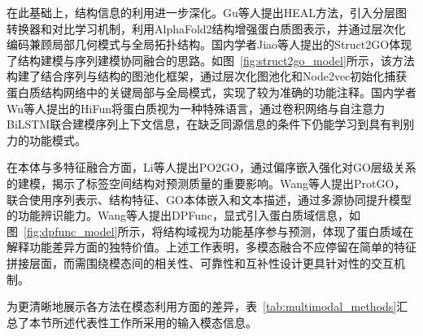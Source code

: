 在此基础上，结构信息的利用进一步深化。Gu等人\cite{gu2023hierarchical}提出HEAL方法，引入分层图转换器和对比学习机制，利用AlphaFold2结构增强蛋白质图表示，并通过层次化编码兼顾局部几何模式与全局拓扑结构。国内学者Jiao等人\cite{jiao2023struct2go}提出的Struct2GO体现了结构建模与序列建模协同融合的思路。如图~\ref{fig:struct2go_model}所示，该方法构建了结合序列与结构的图池化框架，通过层次化图池化和Node2vec\cite{grover2016node2vec}初始化捕获蛋白质结构网络中的关键局部与全局模式，实现了较为准确的功能注释。国内学者Wu等人\cite{wu2023hifun}提出的HiFun将蛋白质视为一种特殊语言，通过卷积网络与自注意力BiLSTM联合建模序列上下文信息，在缺乏同源信息的条件下仍能学习到具有判别力的功能模式。

在本体与多特征融合方面，Li等人\cite{li2024partial}提出PO2GO，通过偏序嵌入强化对GO层级关系的建模，揭示了标签空间结构对预测质量的重要影响。Wang等人\cite{wang2025protgo}提出ProtGO，联合使用序列表示、结构特征、GO本体嵌入和文本描述，通过多源协同提升模型的功能辨识能力。Wang等人\cite{wang2025dpfunc}提出DPFunc，显式引入蛋白质域信息，如图~\ref{fig:dpfunc_model}所示，将结构域视为功能基序参与预测，体现了蛋白质域在解释功能差异方面的独特价值。上述工作表明，多模态融合不应停留在简单的特征拼接层面，而需围绕模态间的相关性、可靠性和互补性设计更具针对性的交互机制。

为更清晰地展示各方法在模态利用方面的差异，表~\ref{tab:multimodal_methods}汇总了本节所述代表性工作所采用的输入模态信息。

